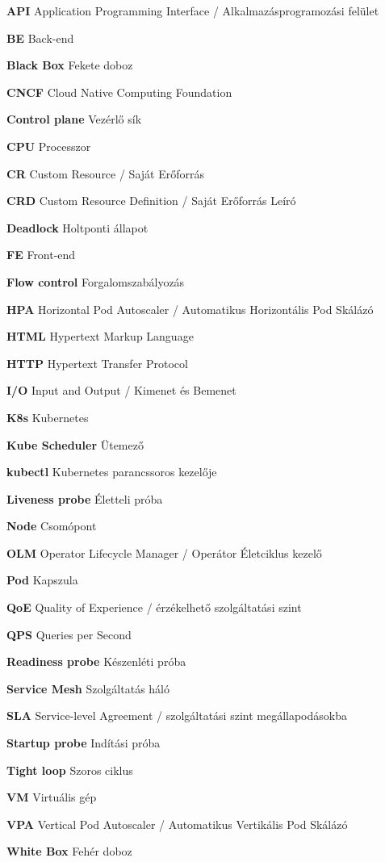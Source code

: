 \begin{multicols}{2}

\textbf{API} Application Programming Interface / Alkalmazásprogramozási felület 

\textbf{BE} Back-end 

\textbf{Black Box} Fekete doboz

\textbf{CNCF} Cloud Native Computing Foundation 

\textbf{Control plane} Vezérlő sík 

\textbf{CPU} Processzor 

\textbf{CR} Custom Resource / Saját Erőforrás 

\textbf{CRD} Custom Resource Definition / Saját Erőforrás Leíró

\textbf{Deadlock} Holtponti állapot

\textbf{FE} Front-end 

\textbf{Flow control} Forgalomszabályozás

\textbf{HPA} Horizontal Pod Autoscaler / Automatikus Horizontális Pod Skálázó 

\textbf{HTML} Hypertext Markup Language 

\textbf{HTTP} Hypertext Transfer Protocol 

\textbf{I/O} Input and Output / Kimenet és Bemenet 

\textbf{K8s} Kubernetes 

\columnbreak %

\textbf{Kube Scheduler} Ütemező 

\textbf{kubectl} Kubernetes parancssoros kezelője 

\textbf{Liveness probe} Életteli próba 

\textbf{Node} Csomópont 

\textbf{OLM} Operator Lifecycle Manager / Operátor Életciklus kezelő 

\textbf{Pod} Kapszula 

\textbf{QoE} Quality of Experience / érzékelhető szolgáltatási szint

\textbf{QPS} Queries per Second 

\textbf{Readiness probe} Készenléti próba 

\textbf{Service Mesh} Szolgáltatás háló

\textbf{SLA} Service-level Agreement / szolgáltatási szint megállapodásokba

\textbf{Startup probe} Indítási próba 

\textbf{Tight loop} Szoros ciklus 

\textbf{VM} Virtuális gép

\textbf{VPA} Vertical Pod Autoscaler / Automatikus Vertikális Pod Skálázó 

\textbf{White Box} Fehér doboz

\end{multicols}

